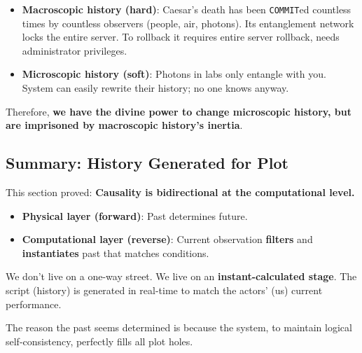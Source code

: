 \begin{itemize}
\item \textbf{Macroscopic history (hard)}: Caesar's death has been \texttt{COMMIT}ed countless times by countless observers (people, air, photons). Its entanglement network locks the entire server. To rollback it requires entire server rollback, needs administrator privileges.
\item \textbf{Microscopic history (soft)}: Photons in labs only entangle with you. System can easily rewrite their history; no one knows anyway.
\end{itemize}

Therefore, \textbf{we have the divine power to change microscopic history, but are imprisoned by macroscopic history's inertia}.

\subsection{Summary: History Generated for Plot}

This section proved: \textbf{Causality is bidirectional at the computational level.}

\begin{itemize}
\item \textbf{Physical layer (forward)}: Past determines future.
\item \textbf{Computational layer (reverse)}: Current observation \textbf{filters} and \textbf{instantiates} past that matches conditions.
\end{itemize}

We don't live on a one-way street. We live on an \textbf{instant-calculated stage}. The script (history) is generated in real-time to match the actors' (us) current performance.

The reason the past seems determined is because the system, to maintain logical self-consistency, perfectly fills all plot holes.
